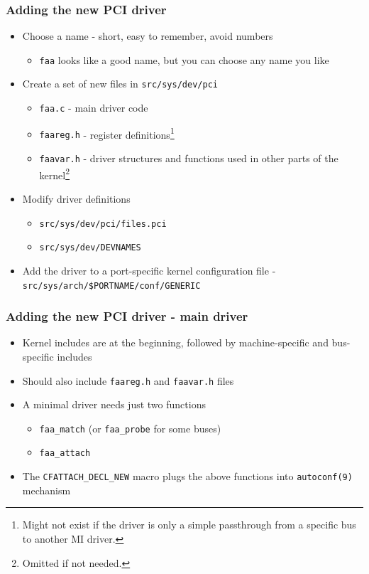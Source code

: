 \documentclass[dvipsnames,table]{beamer}
\begin{document}
\begin{frame}
\frametitle{Adding the new PCI driver}
\begin{itemize}
	\item Choose a name - short, easy to remember, avoid numbers
	\begin{itemize}
		\item {\tt faa} looks like a good name, but you can choose any name you like
	\end{itemize}
	\item Create a set of new files in {\tt src/sys/dev/pci}
	\begin{itemize}
		\item {\tt faa.c} - main driver code
		\item {\tt faareg.h} - register definitions\footnote{Might not exist if the driver is only a simple passthrough from a specific bus to another MI driver.}
		\item {\tt faavar.h} - driver structures and functions used in other parts of the kernel\footnote{Omitted if not needed.}
	\end{itemize}
	\item Modify driver definitions
	\begin{itemize}
		\item {\tt src/sys/dev/pci/files.pci}
		\item {\tt src/sys/dev/DEVNAMES}
	\end{itemize}
	\item Add the driver to a port-specific kernel configuration file - {\tt src/sys/arch/\$PORTNAME/conf/GENERIC}
\end{itemize}
\end{frame}

\begin{frame}
\frametitle{Adding the new PCI driver - main driver}
\begin{itemize}
	\item Kernel includes are at the beginning, followed by machine-specific and bus-specific includes
	\item Should also include {\tt faareg.h} and {\tt faavar.h} files
	\item A minimal driver needs just two functions
	\begin{itemize}
		\item {\tt faa\_match} (or {\tt faa\_probe} for some buses)
		\item {\tt faa\_attach}
	\end{itemize}
	\item The {\tt CFATTACH\_DECL\_NEW} macro plugs the above functions into {\tt autoconf(9)} mechanism
\end{itemize}
\end{frame}
\end{document}
